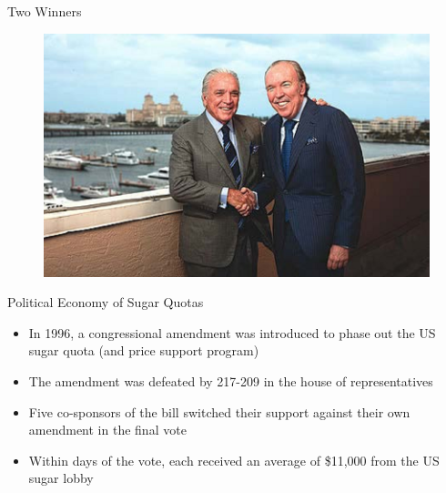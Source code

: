 \documentclass[10pt,hyperref={CJKbookmarks=true},xcolor=dvipsnames,aspectratio=169]{beamer}
\begin{document}
\begin{frame}{Two Winners}


\begin{figure}


\includegraphics[scale=0.4]{fig/politic/lec07-14}

\end{figure}

\end{frame}

\begin{frame}{Political Economy of Sugar Quotas}

\begin{itemize}
\item In 1996, a congressional amendment was introduced to phase out the
US sugar quota (and price support program) 
\item The amendment was defeated by 217-209 in the house of representatives 
\item Five co-sponsors of the bill switched their support against their
own amendment in the final vote 
\item Within days of the vote, each received an average of \$11,000 from
the US sugar lobby
\end{itemize}
\end{frame}
\end{document}
